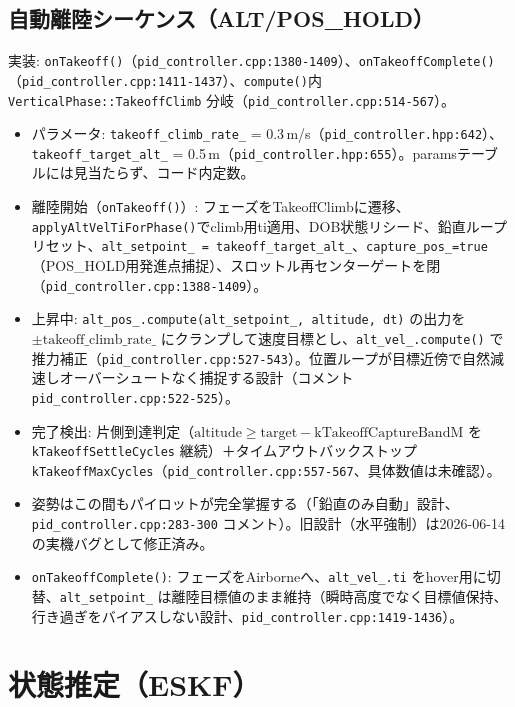 \documentclass[a4paper,10pt]{ltjsarticle}
\begin{document}
\subsection{自動離陸シーケンス（ALT/POS\_HOLD）}

実装: \texttt{onTakeoff()}（\texttt{pid\_controller.cpp:1380-1409}）、\texttt{onTakeoffComplete()}（\texttt{pid\_controller.cpp:1411-1437}）、\texttt{compute()}内 \texttt{VerticalPhase::TakeoffClimb} 分岐（\texttt{pid\_controller.cpp:514-567}）。

\begin{itemize}[leftmargin=*]
  \item パラメータ: \texttt{takeoff\_climb\_rate\_} = 0.3\,m/s（\texttt{pid\_controller.hpp:642}）、\texttt{takeoff\_target\_alt\_} = 0.5\,m（\texttt{pid\_controller.hpp:655}）。paramsテーブルには見当たらず、コード内定数。
  \item 離陸開始（\texttt{onTakeoff()}）: フェーズをTakeoffClimbに遷移、\texttt{applyAltVelTiForPhase()}でclimb用ti適用、DOB状態リシード、鉛直ループリセット、\texttt{alt\_setpoint\_ = takeoff\_target\_alt\_}、\texttt{capture\_pos\_=true}（POS\_HOLD用発進点捕捉）、スロットル再センターゲートを閉（\texttt{pid\_controller.cpp:1388-1409}）。
  \item 上昇中: \texttt{alt\_pos\_.compute(alt\_setpoint\_, altitude, dt)} の出力を $\pm\mathrm{takeoff\_climb\_rate\_}$ にクランプして速度目標とし、\texttt{alt\_vel\_.compute()} で推力補正（\texttt{pid\_controller.cpp:527-543}）。位置ループが目標近傍で自然減速しオーバーシュートなく捕捉する設計（コメント\texttt{pid\_controller.cpp:522-525}）。
  \item 完了検出: 片側到達判定（$\mathrm{altitude} \geq \mathrm{target} - \mathrm{kTakeoffCaptureBandM}$ を \texttt{kTakeoffSettleCycles} 継続）＋タイムアウトバックストップ \texttt{kTakeoffMaxCycles}（\texttt{pid\_controller.cpp:557-567}、具体数値は未確認）。
  \item 姿勢はこの間もパイロットが完全掌握する（「鉛直のみ自動」設計、\texttt{pid\_controller.cpp:283-300} コメント）。旧設計（水平強制）は2026-06-14の実機バグとして修正済み。
  \item \texttt{onTakeoffComplete()}: フェーズをAirborneへ、\texttt{alt\_vel\_.ti} をhover用に切替、\texttt{alt\_setpoint\_} は離陸目標値のまま維持（瞬時高度でなく目標値保持、行き過ぎをバイアスしない設計、\texttt{pid\_controller.cpp:1419-1436}）。
\end{itemize}

\section{状態推定（ESKF）}
\end{document}
